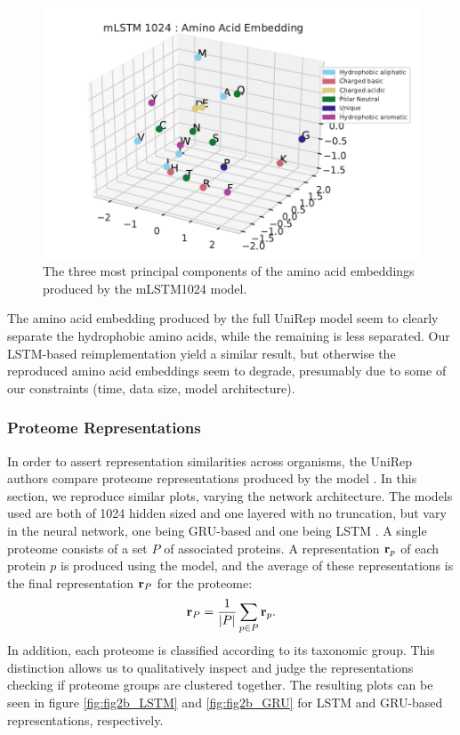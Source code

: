 \documentclass[a4paper,12pt]{article}
\begin{document}
\begin{figure}[H]
    \centering
    \includegraphics[width=\linewidth]{figures/fig2a_mLSTM_1024_no_trunc.pdf}
    \caption{The three most principal components of the amino acid embeddings produced by the mLSTM1024 model.}
    \label{fig:fig2a_mLSTM}
\end{figure}


The amino acid embedding produced by the full UniRep model seem to clearly separate the hydrophobic amino acids, while the remaining is less separated. Our LSTM-based reimplementation yield a similar result, but otherwise the reproduced amino acid embeddings seem to degrade, presumably due to some of our constraints (time, data size, model architecture). 

\subsubsection{Proteome Representations}
\label{section:proteome}
In order to assert representation similarities across organisms, the UniRep authors compare proteome representations produced by the model \cite{alley2019unified}. In this section, we reproduce similar plots, varying the network architecture. The models used are both of 1024 hidden sized and one layered with no truncation, but vary in the neural network, one being GRU-based and one being LSTM . A single proteome consists of a set $P$ of associated proteins. A representation $\mathbf{ r }_p$ of each protein $p$ is produced using the model, and the average of these representations is the final representation $\mathbf{ r }_P$ for the proteome:
\[ \mathbf{ r }_P = \frac{1}{|P|} \sum_{p \in P} \mathbf{ r }_p. \]
In addition, each proteome is classified according to its taxonomic group. This distinction allows us to qualitatively inspect and judge the representations checking if proteome groups are clustered together. The resulting plots can be seen in figure \ref{fig:fig2b_LSTM} and \ref{fig:fig2b_GRU} for LSTM and GRU-based representations, respectively.
\end{document}
